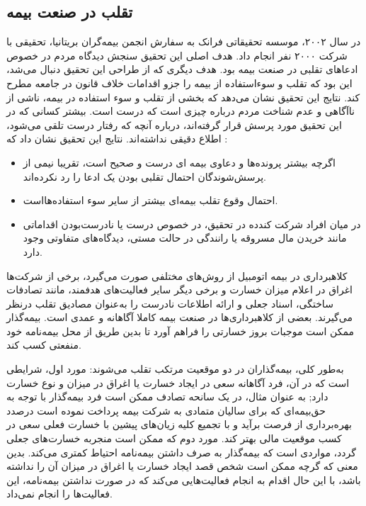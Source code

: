 \documentclass[paper=a4, fontsize=11pt]{article}
\numberwithin{equation}{section} %
\numberwithin{figure}{section} %
\numberwithin{table}{section} %
\begin{document}
\subsection{تقلب در صنعت بیمه}
\par
در سال ۲۰۰۲، موسسه تحقیقاتی فرانک به سفارش انجمن بیمه‌گران بریتانیا، تحقیقی با شرکت ۲۰۰۰ نفر انجام داد. هدف اصلی این تحقیق سنجش دیدگاه مردم در خصوص ادعاهای تقلبی در صنعت بیمه بود. هدف دیگری که از طراحی این تحقیق دنبال می‌شد، این بود که تقلب و سوءاستفاده از بیمه را جزو اقدامات خلاف قانون در جامعه مطرح کند. نتایج این تحقیق نشان می‌دهد که بخشی از تقلب و سوء استفاده در بیمه، ناشی از ناآگاهی و عدم شناخت مردم درباره چیزی است که درست است. بیشتر کسانی که در این تحقیق مورد پرسش قرار گرفته‌اند، درباره آنچه که رفتار درست تلقی می‌شود، اطلاع دقیقی نداشته‌اند. نتایج این تحقیق نشان داد که :
\begin{itemize}
    \item 
    اگرچه بیشتر پرونده‌ها و دعاوی بیمه ای درست و صحیح است، تقریبا نیمی از پرسش‌شوندگان احتمال تقلبی بودن یک ادعا را رد نکرده‌اند.
    \item
    احتمال وقوع تقلب بیمه‌ای بیشتر از سایر سوء استفاده‌هااست.
    \item
    در میان افراد شرکت کندده در تحقیق، در خصوص درست یا نادرست‌بودن اقداماتی مانند خریدن مال مسروقه یا رانندگی در حالت مستی، دیدگاه‌های متفاوتی وجود دارد.
\end{itemize}
\par
کلاهبرداری در بیمه اتومبیل از روش‌های مختلفی صورت می‌گیرد، برخی از شرکت‌ها اغراق در اعلام میزان خسارت و برخی دیگر سایر فعالیت‌های هدفمند، مانند تصادفات ساختگی، اسناد جعلی و ارائه اطلاعات نادرست را به‌عنوان مصادیق تقلب در‌نظر می‌گیرند.
بعضی از کلاهبرداری‌ها در صنعت بیمه کاملا آگاهانه و عمدی است. بیمه‌گذار ممکن است موجبات بروز خسارتی را فراهم آورد تا بدین طریق از محل بیمه‌نامه خود منفعتی کسب کند.
\par
به‌طور کلی، بیمه‌گذاران در دو موقعیت مرتکب تقلب می‌شوند: مورد اول، شرایطی است که در آن، فرد آگاهانه سعی در ایجاد خسارت یا اغراق در میزان و نوع خسارت دارد; به عنوان مثال، در یک سانحه تصادف ممکن است فرد بیمه‌گذار با توجه به حق‌بیمه‌ای که برای سالیان متمادی به شرکت بیمه پرداخت نموده است درصدد بهره‌برداری از فرصت برآید و با تجمیع کلیه زیان‌های پیشین با خسارت فعلی سعی در کسب موقعیت مالی بهتر کند. مورد دوم که ممکن است منجر‌به خسارت‌های جعلی گردد، مواردی است که بیمه‌گذار به صرف داشتن بیمه‌نامه احتیاط کمتری می‌کند. بدین معنی که گرچه ممکن است شخص قصد ایجاد خسارت یا اغراق در میزان آن را نداشته باشد، با این حال اقدام به انجام فعالیت‌هایی می‌کند که در صورت نداشتن بیمه‌نامه، این فعالیت‌ها را انجام نمی‌داد.
\end{document}
